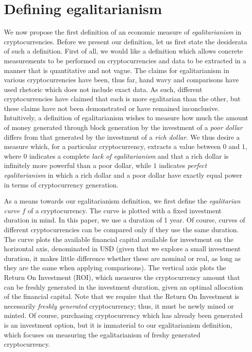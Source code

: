 
\section{Defining egalitarianism}\label{sec:definition}

We now propose the first definition of an economic measure of
\emph{egalitarianism} in cryptocurrencies. Before we present our definition, let
us first state the desiderata of such a definition. First of all, we would like
a definition which allows concrete measurements to be performed on
cryptocurrencies and data to be extracted in a manner that is quantitative and
not vague. The claims for egalitarianism in various cryptocurrencies have been,
thus far, hand wavy and comparisons have used rhetoric which does not include
exact data. As such, different cryptocurrencies have claimed that each is more
egalitarian than the other, but these claims have not been demonstrated or have
remained inconclusive. Intuitively, a definition of egalitarianism wishes to
measure how much the amount of money generated through block generation by the
investment of a \emph{poor dollar} differs from that generated by the investment
of a \emph{rich dollar}. We thus desire a measure which, for a particular
cryptocurrency, extracts a value between $0$ and $1$, where $0$ indicates a
complete \emph{lack of egalitarianism} and that a rich dollar is infinitely more
powerful than a poor dollar, while $1$ indicates \emph{perfect egalitarianism}
in which a rich dollar and a poor dollar have exactly equal power in terms of
cryptocurrency generation.

As a means towards our egalitarianism definition, we first define the
\emph{egalitarian curve} $f$ of a cryptocurrency. The curve is plotted with a
fixed investment duration in mind. In this paper, we use a duration of 1 year.
Of course, curves of different cryptocurrencies can be compared only if they
use the same duration. The curve plots the available financial capital available
for investment on the horizontal axis, denominated in USD (given that we explore
a small investment duration, it makes little difference whether these are
nominal or real, as long as they are the same when applying comparisons). The
vertical axis plots the Return On Investment (ROI), which measures the
cryptocurrency amount that can be freshly generated in the investment duration,
given an optimal allocation of the financial capital. Note that we require that
the Return On Investment is necessarily \emph{freshly generated} cryptocurrency;
thus, it must be newly mined or minted. Of course, purchasing cryptocurrency
which has already been generated is an investment option, but it is immaterial
to our egalitarianism definition, which focuses on measuring the egalitarianism
of freshy generated cryptocurrency.

